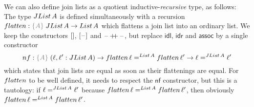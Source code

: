 \documentclass[a4paper,UKenglish,numberwithinsect,cleveref,thm-restate]{lipics-v2021}
\begin{document}
We can also define join lists as a quotient inductive-\emph{recursive} type, as follows: The type $\JList{A}$ is defined simultaneously with a recursion $\flatten : \implicit{A}\;\JList{A} \to \List{A}$ which flattens a join list into an ordinary list. We keep the constructors $\Jnil$, $\Jsing{\blank}$ and $\mathord{\hspace{1pt}\text{--}\hspace{1pt}} \mathop{+\!\!+} \mathord{\hspace{1pt}\text{--}\hspace{1pt}}$, but replace $\mathsf{idl}$, $\mathsf{idr}$ and $\mathsf{assoc}$ by a single constructor
\[
  \mathsf{nf} : \implicit{A}\;(\ell, \ell' : \JList{A}) \to \flatten\,\ell =^{\mathsf{List}\,A} \flatten\,\ell' \to \ell =^{\JList{A}} \ell'
\]
which states that join lists are equal as soon as their flattenings are equal. For $\flatten$ to be well defined, it needs to respect the $\mathsf{nf}$ constructor, but this is a tautology: if $\ell =^{\JList{A}} \ell'$ because $\flatten\,\ell =^{\mathsf{List}\,A} \flatten\,\ell'$, then obviously $\flatten\,\ell =^{\mathsf{List}\,A} \flatten\,\ell'$.

\end{document}
